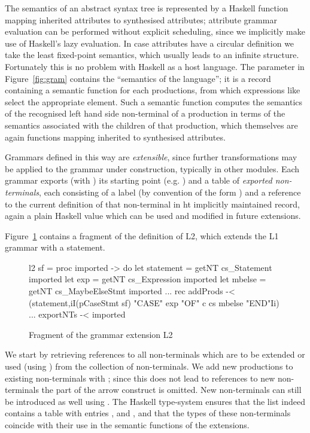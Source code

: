 The semantics of an abstract syntax tree is represented by a Haskell function mapping inherited attributes to synthesised attributes; attribute grammar evaluation can be performed without explicit scheduling, since we implicitly make use of Haskell's lazy evaluation. In case attributes have a circular definition we take the least fixed-point semantics, which usually leads to an infinite structure. Fortunately this is no problem with Haskell as a host language.
The parameter  in Figure~\ref{fig:gram}  contains the ``semantics of the language''; it is a record containing a semantic function for each productions, from which expressions like  select the appropriate element. Such a semantic function computes the semantics of the recognised left hand side non-terminal of a production in terms of the semantics associated with the children of that production, which themselves are again functions mapping inherited to synthesised attributes.


Grammars defined in this way are \emph{extensible}, since further transformations may be applied to the grammar under construction, typically  in other modules.  
Each grammar exports (with ) its starting point (e.g. ) and a table  of
\emph{exported non-terminals}, each consisting of a label (by convention of  the
form ) and a reference to the current definition of that non-terminal in ht implicitly maintained record, again a plain Haskell value which can be used and modified in future extensions.

Figure~\ref{fig:gram2} contains a fragment of the definition of L2, 
which extends the L1 grammar with a  statement.
\begin{figure}[th]
\begin{center}
\begin{haskell}
l2 sf = proc imported -> do
     let statement = getNT cs_Statement     imported 
     let exp       = getNT cs_Expression    imported 
     let mbelse    = getNT cs_MaybeElseStmt imported 
     ...
     rec addProds -< (statement,iI(pCaseStmt sf) "CASE" exp "OF" 
                                                 c cs mbelse "END"Ii)
     ...
     exportNTs -< imported
\end{haskell} 
\vspace{-15pt}
\caption{Fragment of the grammar extension L2}
\label{fig:gram2}
\end{center}
\end{figure}
We start by retrieving references to all non-terminals which are to be extended or used (using ) from the collection of non-terminals.
We add new productions to existing non-terminals with ; since this does not lead to references to new non-terminals the  part of the arrow construct is omitted.
New non-terminals can still be introduced as well using .
The Haskell type-system ensures that 
the  list indeed contains a table with entries , 
 and , 
and that the types of these non-terminals coincide with their use in the semantic functions of
the extensions.


